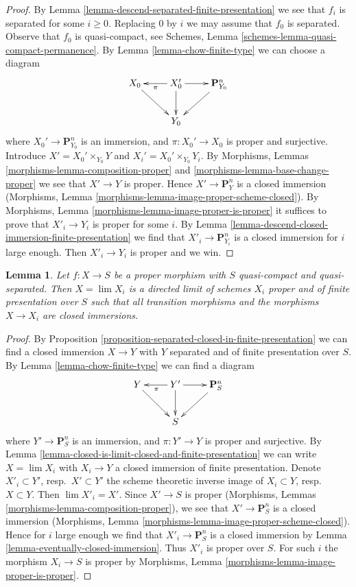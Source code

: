 \documentclass{stacks-project}
\theoremstyle{plain}
\newtheorem{lemma}[subsection]{Lemma}
\theoremstyle{definition}
\theoremstyle{remark}
\numberwithin{equation}{subsection}
\def\lim{\mathop{\mathrm{lim}}\nolimits}
\begin{document}
\begin{proof}
By Lemma \ref{lemma-descend-separated-finite-presentation} we see that
$f_i$ is separated for some $i \geq 0$. Replacing
$0$ by $i$ we may assume that $f_0$ is separated.
Observe that $f_0$ is quasi-compact, see
Schemes, Lemma \ref{schemes-lemma-quasi-compact-permanence}.
By Lemma \ref{lemma-chow-finite-type} we can choose a diagram
$$
\xymatrix{
X_0 \ar[rd] & X_0' \ar[d] \ar[l]^\pi \ar[r] & \mathbf{P}^n_{Y_0} \ar[dl] \\
& Y_0 &
}
$$
where $X_0' \to \mathbf{P}^n_{Y_0}$ is an immersion, and
$\pi : X_0' \to X_0$ is proper and surjective. Introduce
$X' = X_0' \times_{Y_0} Y$ and $X_i' = X_0' \times_{Y_0} Y_i$.
By Morphisms, Lemmas \ref{morphisms-lemma-composition-proper} and
\ref{morphisms-lemma-base-change-proper}
we see that $X' \to Y$ is proper. Hence $X' \to \mathbf{P}^n_Y$ is
a closed immersion (Morphisms, Lemma
\ref{morphisms-lemma-image-proper-scheme-closed}). By
Morphisms, Lemma \ref{morphisms-lemma-image-proper-is-proper}
it suffices to prove that $X'_i \to Y_i$ is proper for some $i$.
By Lemma \ref{lemma-descend-closed-immersion-finite-presentation}
we find that $X'_i \to \mathbf{P}^n_{Y_i}$ is
a closed immersion for $i$ large enough. Then $X'_i \to Y_i$
is proper and we win.
\end{proof}

\begin{lemma}
\label{lemma-proper-limit-of-proper-finite-presentation}
Let $f : X \to S$ be a proper morphism with $S$ quasi-compact and
quasi-separated. Then $X = \lim X_i$ is a directed limit of schemes
$X_i$ proper and of finite presentation over $S$ such that
all transition morphisms and the morphisms $X \to X_i$ are closed
immersions.
\end{lemma}

\begin{proof}
By Proposition \ref{proposition-separated-closed-in-finite-presentation}
we can find a closed immersion $X \to Y$ with $Y$ separated and of
finite presentation over $S$. By Lemma \ref{lemma-chow-finite-type}
we can find a diagram
$$
\xymatrix{
Y \ar[rd] & Y' \ar[d] \ar[l]^\pi \ar[r] & \mathbf{P}^n_S \ar[dl] \\
& S &
}
$$
where $Y' \to \mathbf{P}^n_S$ is an immersion, and
$\pi : Y' \to Y$ is proper and surjective. By
Lemma \ref{lemma-closed-is-limit-closed-and-finite-presentation}
we can write $X = \lim X_i$ with $X_i \to Y$ a closed immersion of
finite presentation. Denote $X'_i \subset Y'$, resp.\ $X' \subset Y'$
the scheme theoretic inverse image of $X_i \subset Y$, resp.\ $X \subset Y$.
Then $\lim X'_i = X'$. Since $X' \to S$ is proper
(Morphisms, Lemmas \ref{morphisms-lemma-composition-proper}), we see that
$X' \to \mathbf{P}^n_S$ is a closed immersion (Morphisms, Lemma
\ref{morphisms-lemma-image-proper-scheme-closed}). Hence for $i$ large enough
we find that $X'_i \to \mathbf{P}^n_S$ is a closed immersion by
Lemma \ref{lemma-eventually-closed-immersion}.
Thus $X'_i$ is proper over $S$.
For such $i$ the morphism $X_i \to S$ is proper by
Morphisms, Lemma \ref{morphisms-lemma-image-proper-is-proper}.
\end{proof}
\end{document}
